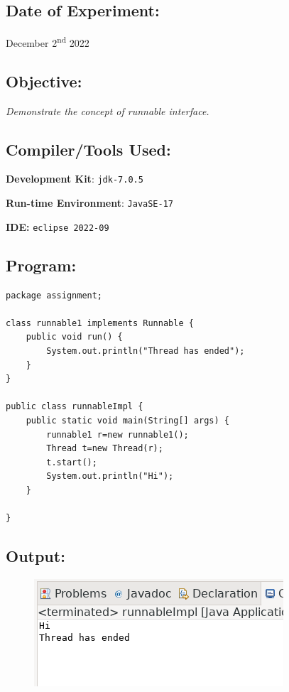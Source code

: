 \documentclass[12pt, a4paper]{article}
\begin{document}
\subsection*{Date of Experiment:}
December 2\textsuperscript{nd} 2022

\subsection*{Objective:}
\emph{\large{Demonstrate the concept of runnable interface.}}

\subsection*{Compiler/Tools Used:}
\textbf{Development Kit}: \verb+jdk-7.0.5+

\textbf{Run-time Environment}: \verb+JavaSE-17+

\textbf{IDE:} \verb+eclipse 2022-09+

\subsection*{Program:}
\begin{lstlisting}
package assignment;

class runnable1 implements Runnable {
	public void run() {
		System.out.println("Thread has ended");
	}
}

public class runnableImpl {
	public static void main(String[] args) {
		runnable1 r=new runnable1();
		Thread t=new Thread(r);
		t.start();
		System.out.println("Hi");
	}

}

\end{lstlisting}
\newpage

\subsection*{Output:}
\begin{figure}[h]
  \centering
  \includegraphics[width=\textwidth]{runnable}
\end{figure}
\newpage
\end{document}
